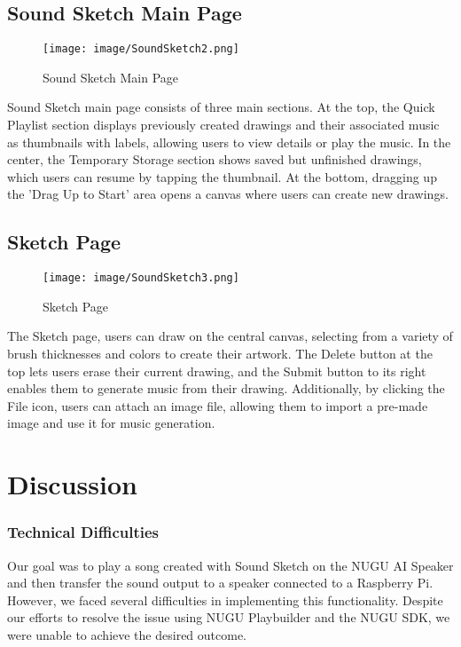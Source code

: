 \documentclass[conference]{IEEEtran}
\begin{document}
\clearpage

\subsection{Sound Sketch Main Page}
\begin{figure}[h!]
    \centering
    \texttt{[image: image/SoundSketch2.png]}
    \caption{Sound Sketch Main Page }
    \label{fig:enter-label}
\end{figure}

\noindentThe Sound Sketch main page consists of three main sections. At the top, the Quick Playlist section displays previously created drawings and their associated music as thumbnails with labels, allowing users to view details or play the music. In the center, the Temporary Storage section shows saved but unfinished drawings, which users can resume by tapping the thumbnail. At the bottom, dragging up the 'Drag Up to Start' area opens a canvas where users can create new drawings.\\


\subsection{Sketch Page}
\begin{figure}[h!]
    \centering
    \texttt{[image: image/SoundSketch3.png]}
    \caption{Sketch Page}
    \label{fig:enter-label}
\end{figure}

\noindentOn The Sketch page, users can draw on the central canvas, selecting from a variety of brush thicknesses and colors to create their artwork. The Delete button at the top lets users erase their current drawing, and the Submit button to its right enables them to generate music from their drawing. Additionally, by clicking the File icon, users can attach an image file, allowing them to import a pre-made image and use it for music generation.\\


\section{Discussion}

\subsubsection{Technical Difficulties}
Our goal was to play a song created with Sound Sketch on the NUGU AI Speaker and then transfer the sound output to a speaker connected to a Raspberry Pi. However, we faced several difficulties in implementing this functionality. Despite our efforts to resolve the issue using NUGU Playbuilder and the NUGU SDK, we were unable to achieve the desired outcome.
\end{document}
